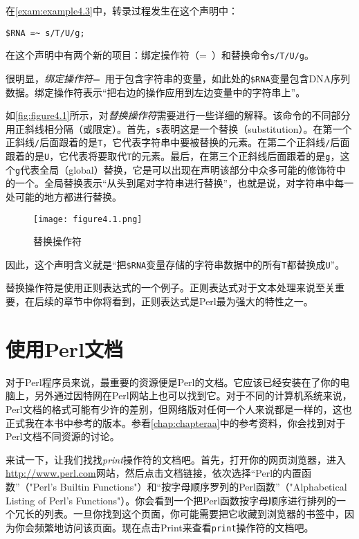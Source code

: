 在\autoref{exam:example4.3}中，转录过程发生在这个声明中：

\begin{lstlisting}
$RNA =~ s/T/U/g;
\end{lstlisting}

在这个声明中有两个新的项目：绑定操作符（=~）和替换命令\verb|s/T/U/g|。

很明显，\textit{绑定操作符}=~用于包含字符串的变量，如此处的\verb|$RNA|变量包含DNA序列数据。绑定操作符表示“把右边的操作应用到左边变量中的字符串上”。

如\autoref{fig:figure4.1}所示，对\textit{替换操作符}需要进行一些详细的解释。该命令的不同部分用正斜线相分隔（或限定）。首先，\verb|s|表明这是一个替换（substitution）。在第一个正斜线\verb|/|后面跟着的是\verb|T|，它代表字符串中要被替换的元素。在第二个正斜线\verb|/|后面跟着的是\verb|U|，它代表将要取代\verb|T|的元素。最后，在第三个正斜线后面跟着的是\verb|g|，这个\verb|g|代表全局（global）替换，它是可以出现在声明该部分中众多可能的修饰符中的一个。全局替换表示“从头到尾对字符串进行替换”，也就是说，对字符串中每一处可能的地方都进行替换。

\begin{figure}
  \centering
  \texttt{[image: figure4.1.png]}
  \caption{替换操作符}
  \label{fig:figure4.1}
\end{figure}

因此，这个声明含义就是“把\verb|$RNA|变量存储的字符串数据中的所有\verb|T|都替换成\verb|U|”。

替换操作符是使用正则表达式的一个例子。正则表达式对于文本处理来说至关重要，在后续的章节中你将看到，正则表达式是Perl最为强大的特性之一。

\section{使用Perl文档}
对于Perl程序员来说，最重要的资源便是Perl的文档。它应该已经安装在了你的电脑上，另外通过因特网在Perl网站上也可以找到它。对于不同的计算机系统来说，Perl文档的格式可能有少许的差别，但网络版对任何一个人来说都是一样的，这也正式我在本书中参考的版本。参看\autoref{chap:chapteraa}中的参考资料，你会找到对于Perl文档不同资源的讨论。

来试一下，让我们找找\textit{print}操作符的文档吧。首先，打开你的网页浏览器，进入\href{http://www.perl.com}{http://www.perl.com}网站，然后点击文档链接，依次选择“Perl的内置函数”（"Perl's Builtin Functions"）和“按字母顺序罗列的Perl函数”（"Alphabetical Listing of Perl's Functions"）。你会看到一个把Perl函数按字母顺序进行排列的一个冗长的列表。一旦你找到这个页面，你可能需要把它收藏到浏览器的书签中，因为你会频繁地访问该页面。现在点击Print来查看\verb|print|操作符的文档吧。

